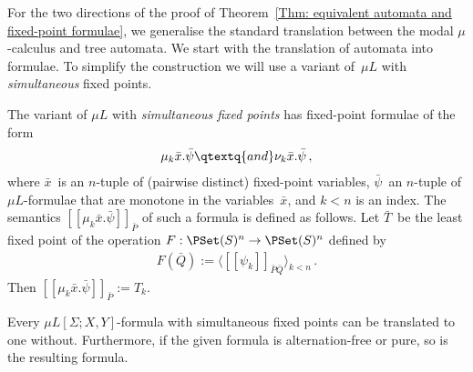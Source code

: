 \documentclass[10pt, fleqn]{scrartcl}
\newcommand*{\?}{\kern .08em}
\newcommand\lsem{[\![}
\newcommand\rsem{]\!]}
\begin{document}
For the two directions of the proof of
Theorem~\ref{Thm: equivalent automata and fixed-point formulae},
we generalise the standard translation between the modal $\mu$-calculus and tree automata.
We start with the translation of automata into formulae. To simplify the construction
we will use a variant of~$\mu L$ with \emph{simultaneous} fixed points.
\begin{Def}
The variant of $\mu L$ with \emph{simultaneous fixed points} has fixed-point formulae
of the form
\begin{align*}
  \mu_k\bar x.\bar\psi
  \qtextq{and}
  \nu_k\bar x.\bar\psi\,,
\end{align*}
where $\bar x$~is an $n$-tuple of (pairwise distinct) fixed-point variables,
$\bar\psi$~an $n$-tuple of $\mu L$-formulae that are monotone in the variables~$\bar x$,
and $k < n$ is an index.
The semantics $\lsem\mu_k\bar x.\bar\psi\rsem_{\bar P}$ of such a formula is defined
as follows. Let $\bar T$~be the least fixed point of the operation
$F : \PSet(S)^n \to \PSet(S)^n$ defined by
\begin{align*}
  F(\bar Q) := \bigl\langle\lsem\psi_k\rsem_{\bar P\bar Q}\bigr\rangle_{k < n}\,.
\end{align*}
Then $\lsem\mu_k\bar x.\bar\psi\rsem_{\bar P} := T_k$.
\end{Def}
\begin{Lem}\label{Lem: elimination of simultaneous fixed points}
Every $\mu L[\Sigma;X,Y]$-formula with simultaneous fixed points can be translated to one
without.
Furthermore, if the given formula is alternation-free or pure, so is the resulting formula.
\end{Lem}
\end{document}
